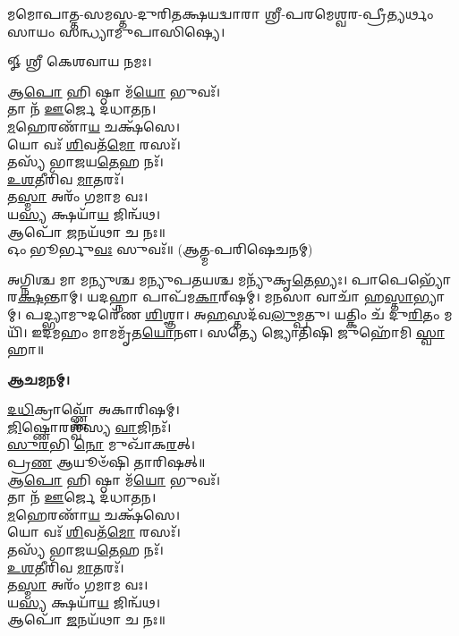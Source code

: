 𑌮𑌮𑍋𑌪𑌾𑌤𑍍𑌤-𑌸𑌮𑌸𑍍𑌤-𑌦𑍁𑌰𑌿𑌤𑌕𑍍𑌷𑌯𑌦𑍍𑌵𑌾𑌰𑌾 𑌶𑍍𑌰𑍀-𑌪𑌰𑌮𑍇𑌶𑍍𑌵𑌰-𑌪𑍍𑌰𑍀𑌤𑍍𑌯𑌰𑍍𑌥𑌂 𑌸𑌾𑌯𑌂 𑌸𑌨𑍍𑌧𑍍𑌯𑌾𑌮𑍁𑌪𑌾𑌸𑌿𑌷𑍍𑌯𑍇।


𑍐 𑌶𑍍𑌰𑍀 𑌕𑍇𑌶𑌵𑌾𑌯 𑌨𑌮𑌃।

𑌆\-\ul{𑌪𑍋} 𑌹𑌿 𑌷𑍍𑌠𑌾 𑌮᳴\-\ul{𑌯𑍋} 𑌭𑍁𑌵𑌃᳴।\\
𑌤𑌾 𑌨᳴ \ul{𑌊}\-𑌰𑍍𑌜𑍇 𑌦᳴𑌧𑌾𑌤𑌨।\\
\-\ul{𑌮}\-𑌹𑍇𑌰𑌣𑌾᳴\-\ul{𑌯} 𑌚𑌕𑍍𑌷᳴𑌸𑍇।\\
𑌯𑍋 𑌵𑌃᳴ \ul{𑌶𑌿}\-𑌵𑌤᳴\-\ul{𑌮𑍋} 𑌰𑌸𑌃᳴।\\
𑌤𑌸𑍍𑌯᳴ 𑌭𑌾𑌜𑌯\-\ul{𑌤𑍇}\-𑌹 𑌨𑌃᳴।\\
\-\ul{𑌉}\-\-\ul{𑌶}\-𑌤𑍀𑌰𑌿᳴𑌵 \ul{𑌮𑌾}\-𑌤𑌰𑌃᳴।\\
𑌤\-\ul{𑌸𑍍𑌮𑌾} 𑌅𑌰𑌂᳴ 𑌗𑌮𑌾𑌮 𑌵𑌃।\\
𑌯\-\ul{𑌸𑍍𑌯} 𑌕𑍍𑌷𑌯𑌾᳴\-\ul{𑌯} 𑌜𑌿𑌨𑍍𑌵᳴𑌥।\\
𑌆𑌪𑍋᳴ \ul{𑌜}\-𑌨𑌯᳴𑌥𑌾 𑌚 𑌨𑌃॥\\

𑌓𑌂 𑌭𑍂𑌰𑍍𑌭𑍁\-\ul{𑌵𑌃} 𑌸𑍁𑌵𑌃᳴॥ (𑌆𑌤𑍍𑌮-𑌪𑌰𑌿𑌷𑍇𑌚𑌨𑌮𑍍)


𑌅𑌗𑍍𑌨𑌿𑌶𑍍𑌚 𑌮𑌾 𑌮𑌨𑍍𑌯𑍁𑌶𑍍𑌚 𑌮𑌨𑍍𑌯𑍁𑌪𑌤𑌯𑌶𑍍𑌚 𑌮𑌨𑍍𑌯𑍁᳴𑌕𑍃\-\ul{𑌤𑍇}\-𑌭𑍍𑌯𑌃। 𑌪𑌾𑌪𑍇𑌭𑍍𑌯𑍋᳴ 𑌰\-\ul{𑌕𑍍𑌷}\-𑌨𑍍𑌤𑌾𑌮𑍍। 𑌯𑌦𑌹𑍍𑌨𑌾 𑌪𑌾𑌪᳴𑌮\-\ul{𑌕𑌾}\-𑌰𑍍‌𑌷𑌮𑍍। 𑌮𑌨𑌸𑌾 𑌵𑌾𑌚𑌾᳴ 𑌹\-\ul{𑌸𑍍𑌤𑌾}\-𑌭𑍍𑌯𑌾𑌮𑍍। 𑌪𑌦𑍍𑌭𑍍𑌯𑌾𑌮𑍁𑌦𑌰𑍇᳴𑌣 \ul{𑌶𑌿}\-𑌶𑍍𑌞𑌾। 𑌅\-\ul{𑌹}\-𑌸𑍍𑌤𑌦᳴𑌵\-\ul{𑌲𑍁}\-𑌮𑍍𑌪𑌤𑍁। 𑌯𑌤𑍍𑌕𑌿𑌂 𑌚᳴ 𑌦𑍁\-\ul{𑌰𑌿}\-𑌤𑌂 𑌮𑌯𑌿᳴। 𑌇𑌦𑌮𑌹𑌂 𑌮𑌾𑌮𑌮𑍃᳴𑌤\-\ul{𑌯𑍋}\-𑌨𑍗। 𑌸𑌤𑍍𑌯𑍇 𑌜𑍍𑌯𑍋𑌤𑌿𑌷𑌿 𑌜𑍁𑌹𑍋᳴𑌮𑌿 \ul{𑌸𑍍𑌵𑌾}\-𑌹𑌾॥


\textbf{𑌆𑌚𑌮𑌨𑌮𑍍।}

\-\ul{𑌦}\-\-\ul{𑌧𑌿}\-𑌕𑍍𑌰𑌾𑌵𑍍𑌣𑍍𑌣𑍋᳴ 𑌅𑌕𑌾𑌰𑌿𑌷𑌮𑍍।\\
 \ul{𑌜𑌿}\-𑌷𑍍𑌣𑍋𑌰𑌶𑍍𑌵᳴𑌸𑍍𑌯 \ul{𑌵𑌾}\-𑌜𑌿𑌨𑌃᳴।\\
\-\ul{𑌸𑍁}\-\-\ul{𑌰}\-𑌭𑌿 \ul{𑌨𑍋} 𑌮𑍁𑌖𑌾᳴𑌕\-\ul{𑌰}\-𑌤𑍍।\\
𑌪𑍍𑌰\-\ul{𑌣} 𑌆𑌯𑍂𑍞᳴𑌷𑌿 𑌤𑌾𑌰𑌿𑌷𑌤𑍍॥\\



𑌆\-\ul{𑌪𑍋} 𑌹𑌿 𑌷𑍍𑌠𑌾 𑌮᳴\-\ul{𑌯𑍋} 𑌭𑍁𑌵𑌃᳴।\\
𑌤𑌾 𑌨᳴ \ul{𑌊}\-𑌰𑍍𑌜𑍇 𑌦᳴𑌧𑌾𑌤𑌨।\\
\-\ul{𑌮}\-𑌹𑍇𑌰𑌣𑌾᳴\-\ul{𑌯} 𑌚𑌕𑍍𑌷᳴𑌸𑍇।\\
𑌯𑍋 𑌵𑌃᳴ \ul{𑌶𑌿}\-𑌵𑌤᳴\-\ul{𑌮𑍋} 𑌰𑌸𑌃᳴।\\
𑌤𑌸𑍍𑌯᳴ 𑌭𑌾𑌜𑌯\-\ul{𑌤𑍇}\-𑌹 𑌨𑌃᳴।\\
\-\ul{𑌉}\-\-\ul{𑌶}\-𑌤𑍀𑌰𑌿᳴𑌵 \ul{𑌮𑌾}\-𑌤𑌰𑌃᳴।\\
𑌤\-\ul{𑌸𑍍𑌮𑌾} 𑌅𑌰𑌂᳴ 𑌗𑌮𑌾𑌮 𑌵𑌃।\\
𑌯\-\ul{𑌸𑍍𑌯} 𑌕𑍍𑌷𑌯𑌾᳴\-\ul{𑌯} 𑌜𑌿𑌨𑍍𑌵᳴𑌥।\\
𑌆𑌪𑍋᳴ \ul{𑌜}\-𑌨𑌯᳴𑌥𑌾 𑌚 𑌨𑌃॥\\

